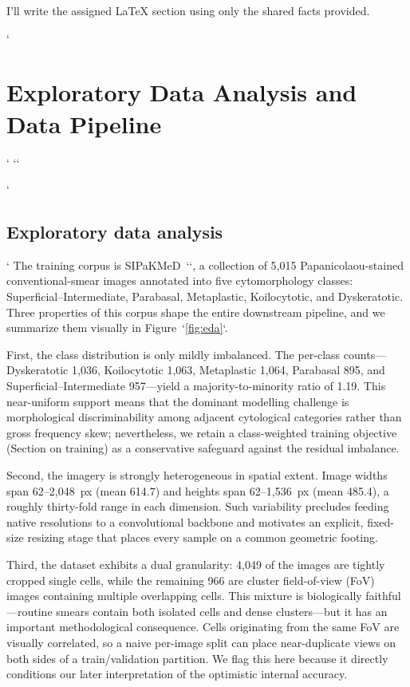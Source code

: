 I'll write the assigned LaTeX section using only the shared facts provided.

`\section{Exploratory Data Analysis and Data Pipeline}`
`\label{sec:methods_data}`

`\subsection{Exploratory data analysis}`
The training corpus is SIPaKMeD~`\citep{plissiti2018sipakmed}`, a collection of 5{,}015 Papanicolaou-stained conventional-smear images annotated into five cytomorphology classes: Superficial--Intermediate, Parabasal, Metaplastic, Koilocytotic, and Dyskeratotic. Three properties of this corpus shape the entire downstream pipeline, and we summarize them visually in Figure~`\ref{fig:eda}`.

First, the class distribution is only mildly imbalanced. The per-class counts---Dyskeratotic 1{,}036, Koilocytotic 1{,}063, Metaplastic 1{,}064, Parabasal 895, and Superficial--Intermediate 957---yield a majority-to-minority ratio of 1.19. This near-uniform support means that the dominant modelling challenge is morphological discriminability among adjacent cytological categories rather than gross frequency skew; nevertheless, we retain a class-weighted training objective (Section on training) as a conservative safeguard against the residual imbalance.

Second, the imagery is strongly heterogeneous in spatial extent. Image widths span 62--2{,}048~px (mean 614.7) and heights span 62--1{,}536~px (mean 485.4), a roughly thirty-fold range in each dimension. Such variability precludes feeding native resolutions to a convolutional backbone and motivates an explicit, fixed-size resizing stage that places every sample on a common geometric footing.

Third, the dataset exhibits a dual granularity: 4{,}049 of the images are tightly cropped single cells, while the remaining 966 are cluster field-of-view (FoV) images containing multiple overlapping cells. This mixture is biologically faithful---routine smears contain both isolated cells and dense clusters---but it has an important methodological consequence. Cells originating from the same FoV are visually correlated, so a naive per-image split can place near-duplicate views on both sides of a train/validation partition. We flag this here because it directly conditions our later interpretation of the optimistic internal accuracy.

